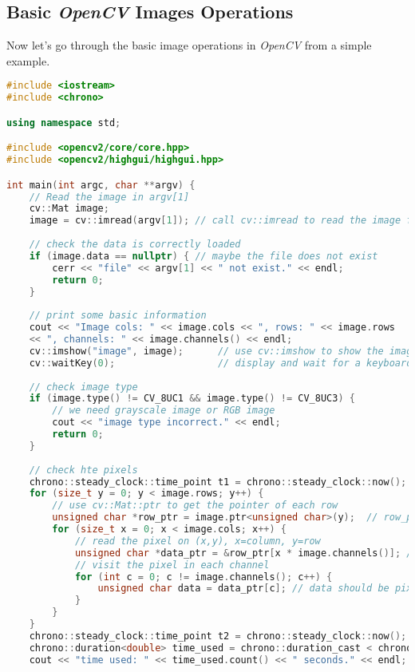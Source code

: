 \subsection{Basic \textit{OpenCV} Images Operations}
Now let's go through the basic image operations in \textit{OpenCV} from a simple example.

\begin{lstlisting}[language=C++,caption=slambook/ch5/imageBasics/imageBasics.cpp]
#include <iostream>
#include <chrono>

using namespace std;

#include <opencv2/core/core.hpp>
#include <opencv2/highgui/highgui.hpp>

int main(int argc, char **argv) {
    // Read the image in argv[1]
    cv::Mat image;
    image = cv::imread(argv[1]); // call cv::imread to read the image from file
    
    // check the data is correctly loaded
    if (image.data == nullptr) { // maybe the file does not exist
        cerr << "file" << argv[1] << " not exist." << endl;
        return 0;
    }
    
    // print some basic information
    cout << "Image cols: " << image.cols << ", rows: " << image.rows 
    << ", channels: " << image.channels() << endl;
    cv::imshow("image", image);      // use cv::imshow to show the image
    cv::waitKey(0);                  // display and wait for a keyboard input
    
    // check image type
    if (image.type() != CV_8UC1 && image.type() != CV_8UC3) {
        // we need grayscale image or RGB image
        cout << "image type incorrect." << endl;
        return 0;
    }
    
    // check hte pixels
    chrono::steady_clock::time_point t1 = chrono::steady_clock::now();
    for (size_t y = 0; y < image.rows; y++) {
        // use cv::Mat::ptr to get the pointer of each row
        unsigned char *row_ptr = image.ptr<unsigned char>(y);  // row_ptr is the pointer to y-th row
        for (size_t x = 0; x < image.cols; x++) {
            // read the pixel on (x,y), x=column, y=row
            unsigned char *data_ptr = &row_ptr[x * image.channels()]; // data_ptr is the pointer to (x,y)
            // visit the pixel in each channel
            for (int c = 0; c != image.channels(); c++) {
                unsigned char data = data_ptr[c]; // data should be pixel of I(x,y) in c-th channel
            }
        }
    }
    chrono::steady_clock::time_point t2 = chrono::steady_clock::now();
    chrono::duration<double> time_used = chrono::duration_cast < chrono::duration < double >> (t2 - t1);
    cout << "time used: " << time_used.count() << " seconds." << endl;
    

\end{lstlisting}
